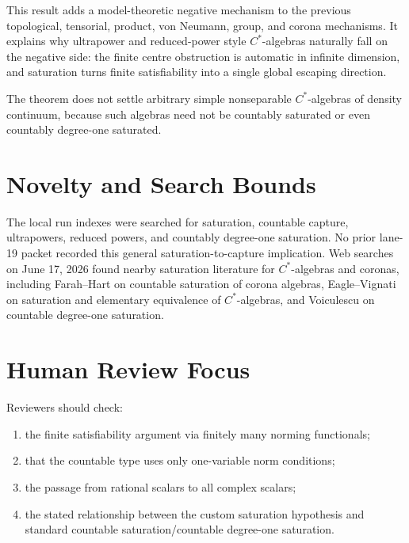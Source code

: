 \documentclass[11pt]{article}
\begin{document}
This result adds a model-theoretic negative mechanism to the previous
topological, tensorial, product, von Neumann, group, and corona mechanisms.
It explains why ultrapower and reduced-power style \(C^*\)-algebras naturally
fall on the negative side: the finite centre obstruction is automatic in
infinite dimension, and saturation turns finite satisfiability into a single
global escaping direction.

The theorem does not settle arbitrary simple nonseparable \(C^*\)-algebras of
density continuum, because such algebras need not be countably saturated or
even countably degree-one saturated.

\section*{Novelty and Search Bounds}

The local run indexes were searched for saturation, countable capture,
ultrapowers, reduced powers, and countably degree-one saturation.  No prior
lane-19 packet recorded this general saturation-to-capture implication.
Web searches on June 17, 2026 found nearby saturation literature for
\(C^*\)-algebras and coronas, including Farah--Hart on countable saturation of
corona algebras, Eagle--Vignati on saturation and elementary equivalence of
\(C^*\)-algebras, and Voiculescu on countable degree-one saturation.

\section*{Human Review Focus}

Reviewers should check:
\begin{enumerate}
    \item the finite satisfiability argument via finitely many norming
          functionals;
    \item that the countable type uses only one-variable norm conditions;
    \item the passage from rational scalars to all complex scalars;
    \item the stated relationship between the custom saturation hypothesis and
          standard countable saturation/countable degree-one saturation.
\end{enumerate}
\end{document}
